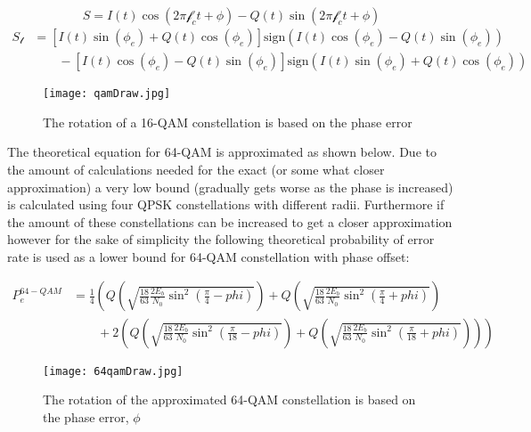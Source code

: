 \documentclass[]{article}
\begin{document}
  \begin{equation}  
  S = I\left(t\right)\cos\left(2\pi\mathcal{f}_{c}t+\phi\right)- Q\left(t\right)\sin\left(2\pi\mathcal{f}_{c}t+\phi\right)
  \end{equation}
  \begin{align}
  S_{\mathcal{l}} &= \left[I\left(t\right)\sin\left(\phi_e\right)+Q\left(t\right)\cos\left(\phi_e\right)\right]\text{sign}\left(I\left(t\right)\cos\left(\phi_e\right)- Q\left(t\right)\sin\left(\phi_e\right)\right)\nonumber \\
  &\qquad {} - \left[I\left(t\right)\cos\left(\phi_e\right)-Q\left(t\right)\sin\left(\phi_e\right)\right]\text{sign}\left(I\left(t\right)\sin\left(\phi_e\right)+Q\left(t\right)\cos\left(\phi_e\right)\right)
  \end{align}
  



\begin{figure}[H]
\centering
\hspace*{-2cm}\texttt{[image: qamDraw.jpg]}
\caption{The rotation of a 16-QAM constellation is based on the phase error \label{fig:qamDraw}}
\end{figure}

\newpage

The theoretical equation for 64-QAM is approximated as shown below. Due to the amount of calculations needed for the exact (or some what closer approximation) a very low bound (gradually gets worse as the phase is increased) is calculated using four QPSK constellations with different radii.  Furthermore if the amount of these constellations can be increased to get a closer approximation however for the sake of simplicity the following theoretical probability of error rate is used as a lower bound for 64-QAM constellation with phase offset: 

\begin{align}
P_{e}^{64-QAM} &= \frac{1}{4}\left(Q\left(\sqrt{\frac{18}{63}\frac{2E_b}{N_0}\sin^2\left(\frac{\pi}{4}-phi\right)}\right) + Q\left(\sqrt{\frac{18}{63}\frac{2E_b}{N_0}\sin^2\left(\frac{\pi}{4}+phi\right)}\right) \right. \nonumber \\
& \qquad \left. {} + 2\left(Q\left(\sqrt{\frac{18}{63}\frac{2E_b}{N_0}\sin^2\left(\frac{\pi}{18}-phi\right)}\right) + Q\left(\sqrt{\frac{18}{63}\frac{2E_b}{N_0}\sin^2\left(\frac{\pi}{18}+phi\right)}\right) \right) \right)
\end{align}

\begin{figure}[H]
\centering
\hspace*{-2cm}\texttt{[image: 64qamDraw.jpg]}
\caption{The rotation of the approximated 64-QAM constellation is based on the phase error, $\phi$ \label{fig:64QamDraw}}
\end{figure}
\end{document}
